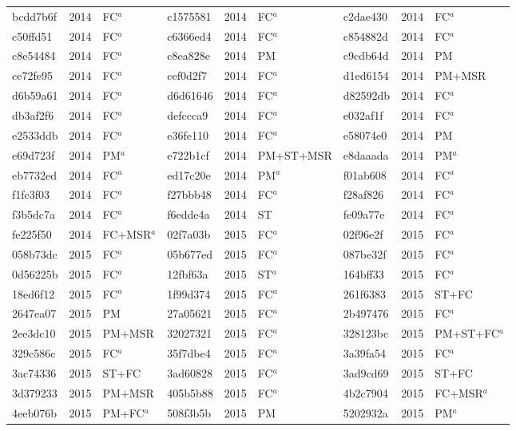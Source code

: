 \begin{longtable}{lll@{\hspace{10pt}}lll@{\hspace{10pt}}lll}
bcdd7b6f & 2014 & FC$^{a}$ & c1575581 & 2014 & FC$^{a}$ & c2dae430 & 2014 & FC$^{a}$ \\
c50ffd51 & 2014 & FC$^{a}$ & c6366ed4 & 2014 & FC$^{a}$ & c854882d & 2014 & FC$^{a}$ \\
c8e54484 & 2014 & FC$^{a}$ & c8ea828e & 2014 & PM & c9cdb64d & 2014 & PM \\
ce72fe95 & 2014 & FC$^{a}$ & cef0d2f7 & 2014 & FC$^{a}$ & d1ed6154 & 2014 & PM+MSR \\
d6b59a61 & 2014 & FC$^{a}$ & d6d61646 & 2014 & FC$^{a}$ & d82592db & 2014 & FC$^{a}$ \\
db3af2f6 & 2014 & FC$^{a}$ & defccca9 & 2014 & FC$^{a}$ & e032af1f & 2014 & FC$^{a}$ \\
e2533ddb & 2014 & FC$^{a}$ & e36fe110 & 2014 & FC$^{a}$ & e58074e0 & 2014 & PM \\
e69d723f & 2014 & PM$^{a}$ & e722b1cf & 2014 & PM+ST+MSR & e8daaada & 2014 & PM$^{a}$ \\
eb7732ed & 2014 & FC$^{a}$ & ed17c20e & 2014 & PM$^{a}$ & f01ab608 & 2014 & FC$^{a}$ \\
f1fc3f03 & 2014 & FC$^{a}$ & f27bbb48 & 2014 & FC$^{a}$ & f28af826 & 2014 & FC$^{a}$ \\
f3b5dc7a & 2014 & FC$^{a}$ & f6edde4a & 2014 & ST & fe09a77e & 2014 & FC$^{a}$ \\
fe225f50 & 2014 & FC+MSR$^{a}$ & 02f7a03b & 2015 & FC$^{a}$ & 02f96e2f & 2015 & FC$^{a}$ \\
058b73dc & 2015 & FC$^{a}$ & 05b677ed & 2015 & FC$^{a}$ & 087be32f & 2015 & FC$^{a}$ \\
0d56225b & 2015 & FC$^{a}$ & 12fbf63a & 2015 & ST$^{a}$ & 164bff33 & 2015 & FC$^{a}$ \\
18ed6f12 & 2015 & FC$^{a}$ & 1f99d374 & 2015 & FC$^{a}$ & 261f6383 & 2015 & ST+FC \\
2647ea07 & 2015 & PM & 27a05621 & 2015 & FC$^{a}$ & 2b497476 & 2015 & FC$^{a}$ \\
2ee3dc10 & 2015 & PM+MSR & 32027321 & 2015 & FC$^{a}$ & 328123bc & 2015 & PM+ST+FC$^{a}$ \\
329c586c & 2015 & FC$^{a}$ & 35f7dbe4 & 2015 & FC$^{a}$ & 3a39fa54 & 2015 & FC$^{a}$ \\
3ac74336 & 2015 & ST+FC & 3ad60828 & 2015 & FC$^{a}$ & 3ad9cd69 & 2015 & ST+FC \\
3d379233 & 2015 & PM+MSR & 405b5b88 & 2015 & FC$^{a}$ & 4b2c7904 & 2015 & FC+MSR$^{a}$ \\
4eeb076b & 2015 & PM+FC$^{a}$ & 508f3b5b & 2015 & PM & 5202932a & 2015 & PM$^{a}$ \\

\end{longtable}
